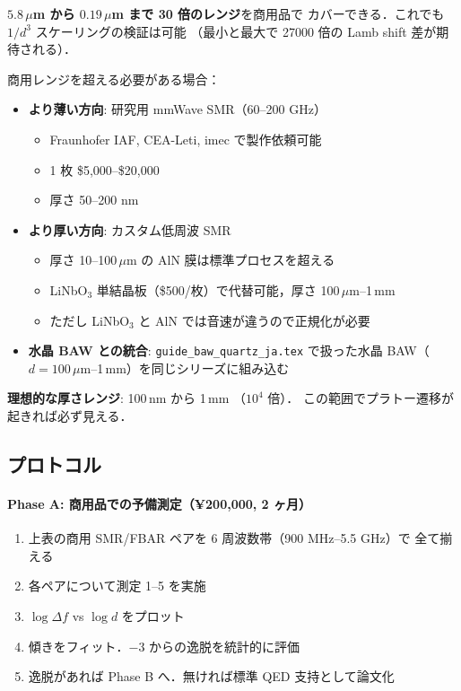 \documentclass[11pt,a4paper]{article}
\begin{document}
\textbf{$5.8\,\mu$m から $0.19\,\mu$m まで 30 倍のレンジ}を商用品で
カバーできる．これでも $1/d^3$ スケーリングの検証は可能
（最小と最大で 27000 倍の Lamb shift 差が期待される）．

商用レンジを超える必要がある場合：

\begin{itemize}
\item \textbf{より薄い方向}: 研究用 mmWave SMR（60--200 GHz）
  \begin{itemize}
  \item Fraunhofer IAF, CEA-Leti, imec で製作依頼可能
  \item 1 枚 \$5,000--\$20,000
  \item 厚さ 50--200 nm
  \end{itemize}
\item \textbf{より厚い方向}: カスタム低周波 SMR
  \begin{itemize}
  \item 厚さ 10--100\,$\mu$m の AlN 膜は標準プロセスを超える
  \item LiNbO$_3$ 単結晶板（\$500/枚）で代替可能，厚さ 100\,$\mu$m--1\,mm
  \item ただし LiNbO$_3$ と AlN では音速が違うので正規化が必要
  \end{itemize}
\item \textbf{水晶 BAW との統合}: \texttt{guide\_baw\_quartz\_ja.tex}
で扱った水晶 BAW（$d = 100\,\mu$m--1\,mm）を同じシリーズに組み込む
\end{itemize}

\textbf{理想的な厚さレンジ}: 100\,nm から 1\,mm （$10^4$ 倍）．
この範囲でプラトー遷移が起きれば必ず見える．

\subsection{プロトコル}

\paragraph{Phase A: 商用品での予備測定（¥200,000, 2 ヶ月）}

\begin{enumerate}
\item 上表の商用 SMR/FBAR ペアを 6 周波数帯（900 MHz--5.5 GHz）で
全て揃える
\item 各ペアについて測定 1--5 を実施
\item $\log\Delta f$ vs $\log d$ をプロット
\item 傾きをフィット．$-3$ からの逸脱を統計的に評価
\item 逸脱があれば Phase B へ．無ければ標準 QED 支持として論文化
\end{enumerate}
\end{document}
